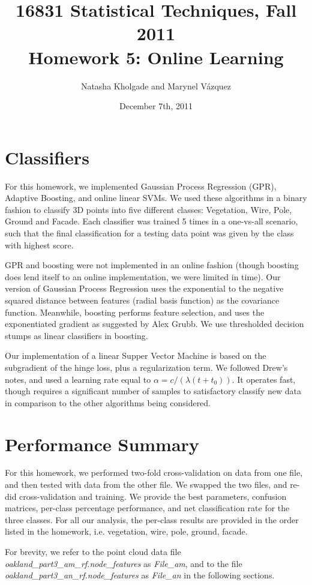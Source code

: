 \documentclass[letterpaper]{article}
\title{16831 Statistical Techniques, Fall 2011\\Homework 5: Online Learning}
\date{December 7th, 2011}
\author{Natasha Kholgade and Marynel V\'azquez}
\begin{document}
\maketitle

\section*{Classifiers}
For this homework, we implemented Gaussian Process Regression (GPR),
Adaptive Boosting, and online linear SVMs. We used these algorithms in a binary
fashion to classify 3D points into five different classes: Vegetation,
Wire, Pole, Ground and Facade. Each classifier was trained 5 times in
a one-vs-all scenario, such that the final classification for a
testing data point was given by the class with highest score.

GPR and boosting were not implemented in an online fashion (though
boosting does lend itself to an online implementation, we were limited
in time). Our version of Gaussian Process Regression uses the
exponential to the negative squared distance between features (radial
basis function) as the covariance function. Meanwhile, boosting
performs feature selection, and uses the exponentiated gradient as
suggested by Alex Grubb. We use thresholded decision stumps as linear
classifiers in boosting.

Our implementation of a linear Supper Vector Machine is based on the
subgradient of the hinge loss, plus a regularization term. We followed
Drew's notes, and used a learning rate equal to $\alpha = c/(\lambda(t
+ t_0))$. It operates fast, though requires a significant number of
samples to satisfactory classify new data in comparison to the other
algorithms being considered.

\section*{Performance Summary}
For this homework, we performed two-fold cross-validation on data from
one file, and then tested with data from the other file. We swapped
the two files, and re-did cross-validation and training. We provide
the best parameters, confusion matrices, per-class percentage
performance, and net classification rate for the three classes. For all our analysis, the per-class results are provided in the order listed in the homework, i.e. vegetation, wire, pole, ground, facade.

For brevity, we refer to the point cloud data file
\textit{oakland\_part3\_am\_rf.node\_features} as \textit{File\_am}, and
to the file \textit{oakland\_part3\_an\_rf.node\_features} as
\textit{File\_an} in the following sections.
\end{document}

